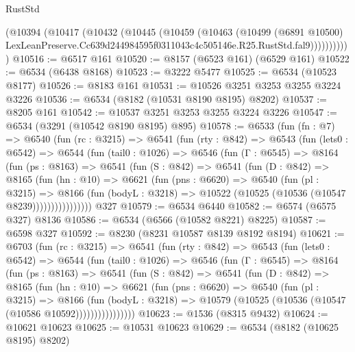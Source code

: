 \begin{lexlean}{RustStd}
\begin{coremodule}
            (@10394
              (@10417
                (@10432
                  (@10445
                    (@10459
                      (@10463
                        (@10499
                          (@6891 @10500)
                          LexLeanPreserve.Cc639d244984595f0311043c4c505146e.R25.RustStd.fal9)))))))))))
@10516 := @6517 @161
@10520 := @8157 (@6523 @161) (@6529 @161)
@10522 := @6534 (@6438 @8168)
@10523 := @3222 @5477
@10525 := @6534 (@10523 @8177)
@10526 := @8183 @161
@10531 := @10526 @3251 @3253 @3255 @3224 @3226
@10536 := @6534 (@8182 (@10531 @8190 @8195) @8202)
@10537 := @8205 @161
@10542 := @10537 @3251 @3253 @3255 @3224 @3226
@10547 := @6534 (@3291 (@10542 @8190 @8195) @895)
@10578 := @6533
    (fun (fn : @7) =>
    @6540
      (fun (rc : @3215) =>
      @6541
        (fun (rty : @842) =>
        @6543
          (fun (lets0 : @6542) =>
          @6544
            (fun (tail0 : @1026) =>
            @6546
              (fun (Γ : @6545) =>
              @8164
                (fun (ps : @8163) =>
                @6541
                  (fun (S : @842) =>
                  @6541
                    (fun (D : @842) =>
                    @8165
                      (fun (hn : @10) =>
                      @6621
                        (fun (pns : @6620) =>
                        @6540
                          (fun (pl : @3215) =>
                          @8166
                            (fun (bodyL : @3218) =>
                            @10522 (@10525 (@10536 (@10547 @8239))))))))))))))))
    @327
@10579 := @6534 @6440
@10582 := @6574 (@6575 @327) @8136
@10586 := @6534 (@6566 (@10582 @8221) @8225)
@10587 := @6598 @327
@10592 := @8230 (@8231 @10587 @8139 @8192 @8194)
@10621 := @6703
    (fun (rc : @3215) =>
    @6541
      (fun (rty : @842) =>
      @6543
        (fun (lets0 : @6542) =>
        @6544
          (fun (tail0 : @1026) =>
          @6546
            (fun (Γ : @6545) =>
            @8164
              (fun (ps : @8163) =>
              @6541
                (fun (S : @842) =>
                @6541
                  (fun (D : @842) =>
                  @8165
                    (fun (hn : @10) =>
                    @6621
                      (fun (pns : @6620) =>
                      @6540
                        (fun (pl : @3215) =>
                        @8166
                          (fun (bodyL : @3218) =>
                          @10579 (@10525 (@10536 (@10547 (@10586 @10592))))))))))))))))
@10623 := @1536 (@8315 @9432)
@10624 := @10621 @10623
@10625 := @10531 @10623
@10629 := @6534 (@8182 (@10625 @8195) @8202)

\end{coremodule}
\end{lexlean}
